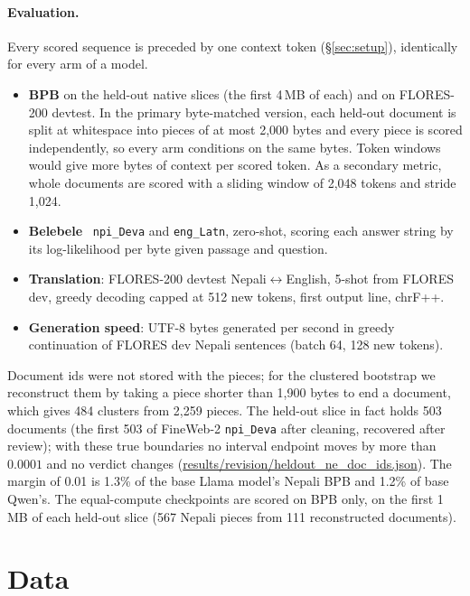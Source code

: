 \paragraph{Evaluation.} Every scored sequence is preceded by one context token (\S\ref{sec:setup}), identically for every arm of a model.
\begin{itemize}
  \setlength\itemsep{0pt}
  \item \textbf{BPB} on the held-out native slices (the first 4\,MB of each) and on FLORES-200 devtest. In the primary byte-matched version, each held-out document is split at whitespace into pieces of at most 2{,}000 bytes and every piece is scored independently, so every arm conditions on the same bytes. Token windows would give \RII{} more bytes of context per scored token. As a secondary metric, whole documents are scored with a sliding window of 2{,}048 tokens and stride 1{,}024.
  \item \textbf{Belebele}~\citep{bandarkar-etal-2024-belebele} \texttt{npi\_Deva} and \texttt{eng\_Latn}, zero-shot, scoring each answer string by its log-likelihood per byte given passage and question.
  \item \textbf{Translation}: FLORES-200 devtest Nepali$\leftrightarrow$English, 5-shot from FLORES dev, greedy decoding capped at 512 new tokens, first output line, chrF++.
  \item \textbf{Generation speed}: UTF-8 bytes generated per second in greedy continuation of FLORES dev Nepali sentences (batch 64, 128 new tokens).
\end{itemize}
Document ids were not stored with the pieces; for the clustered bootstrap we reconstruct them by taking a piece shorter than 1{,}900 bytes to end a document, which gives 484 clusters from 2{,}259 pieces. The held-out slice in fact holds 503 documents (the first 503 of FineWeb-2 \texttt{npi\_Deva} after cleaning, recovered after review); with these true boundaries no interval endpoint moves by more than $0.0001$ and no verdict changes (\url{results/revision/heldout_ne_doc_ids.json}). The margin of 0.01 is 1.3\% of the base Llama model's Nepali BPB and 1.2\% of base Qwen's. The equal-compute checkpoints are scored on BPB only, on the first 1\,MB of each held-out slice (567 Nepali pieces from 111 reconstructed documents).

\section{Data}
\label{app:data}

